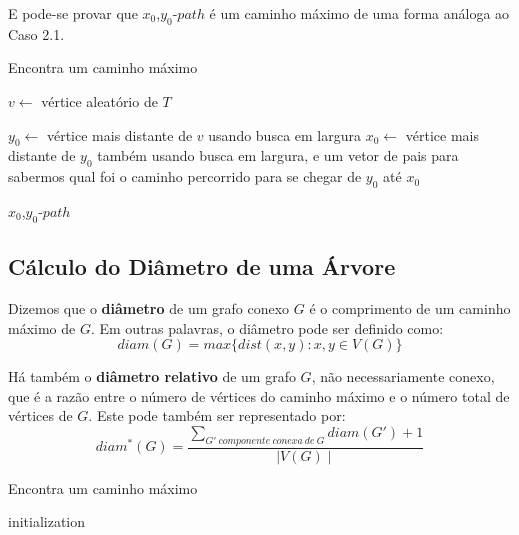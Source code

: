 \documentclass[a4paper,12pt]{article}
\begin{document}
\begin{itemize}
		E pode-se provar que $x_0$,$y_0$-$path$ é um caminho
		máximo de uma forma análoga ao Caso 2.1.





		\begin{algorithm}[H]

			\caption{Encontra um caminho máximo}
			$v \leftarrow$ vértice aleatório de $T$\;

			$y_0 \leftarrow$ vértice mais distante de $v$
			usando busca em largura\;
			$x_0 \leftarrow$ vértice mais distante de $y_0$
			também usando busca em largura, e um vetor de 
			pais para sabermos qual foi o caminho percorrido
			para se chegar de $y_0$ até $x_0$\;

			\Return $x_0$,$y_0$-$path$\;
			
		\end{algorithm}	




    \end{itemize}

	\newpage


	\subsection{Cálculo do Diâmetro de uma Árvore}
		Dizemos que o \textbf{diâmetro} de um grafo conexo $G$ é o
		comprimento de um caminho máximo de $G$. 
		Em outras palavras, o diâmetro pode ser definido como:
		$$ diam(G)=max\{dist(x,y):x,y\in V(G)\} $$

		\bigskip

		Há também o \textbf{diâmetro relativo} de um grafo $G$,
		não necessariamente conexo, que é a razão entre o número
		de vértices do caminho máximo e o número total de vértices
		de $G$. Este pode também ser representado por:
		$$ diam^*(G) = \frac{\displaystyle\sum_{
		G'~componente~conexa~de~G}^{}diam(G')+1}{\mid V(G)\mid} $$



\newpage

    		\begin{algorithm}[H]

				\caption{Encontra um caminho máximo}
				initialization\;
			\end{algorithm}	
    
\end{document}

